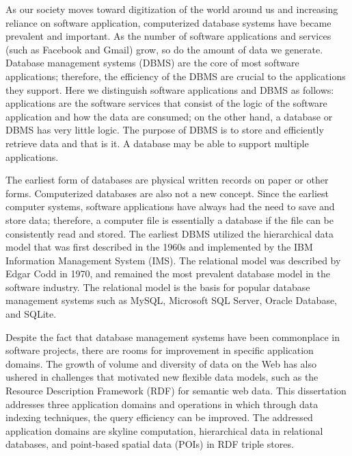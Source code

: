 As our society moves toward digitization of the world around us and increasing reliance on software application, computerized database systems have became prevalent and important. As the number of software applications and services (such as Facebook and Gmail) grow, so do the amount of data we generate. Database management systems (DBMS) are the core of most software applications; therefore, the efficiency of the DBMS are crucial to the applications they support. Here we distinguish software applications and DBMS as follows: applications are the software services that consist of the logic of the software application and how the data are consumed; on the other hand, a database or DBMS has very little logic. The purpose of DBMS is to store and efficiently retrieve data and that is it. A database may be able to support multiple applications.

The earliest form of databases are physical written records on paper or other forms. Computerized databases are also not a new concept. Since the earliest computer systems, software applications have always had the need to save and store data; therefore, a computer file is essentially a database if the file can be consistently read and stored. The earliest DBMS utilized the hierarchical data model\cite{hdbms} that was first described in the 1960s and implemented by the IBM Information Management System (IMS)\cite{ims, intro_ims}. The relational model\cite{DBLP:journals/cacm/Codd70} was described by Edgar Codd in 1970, and remained the most prevalent database model in the software industry. The relational model is the basis for popular database management systems such as MySQL, Microsoft SQL Server, Oracle Database, and SQLite.

Despite the fact that database management systems have been commonplace in software projects, there are rooms for improvement in specific application domains. The growth of volume and diversity of data on the Web has also ushered in challenges that motivated new flexible data models, such as the Resource Description Framework (RDF) for semantic web data. This dissertation addresses three application domains and operations in which through data indexing techniques, the query efficiency can be improved. The addressed application domains are skyline computation, hierarchical data in relational databases, and point-based spatial data (POIs) in RDF triple stores.

